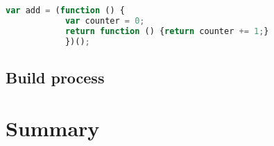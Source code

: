 		\begin{lstlisting}[language=JavaScript, caption={Example of RxJS code.},label={lst:closure}]
			var add = (function () {
			var counter = 0;
			return function () {return counter += 1;}
			})();
		\end{lstlisting}
		
		
	
	
	\subsection{Build process}

	
\section{Summary}

	



